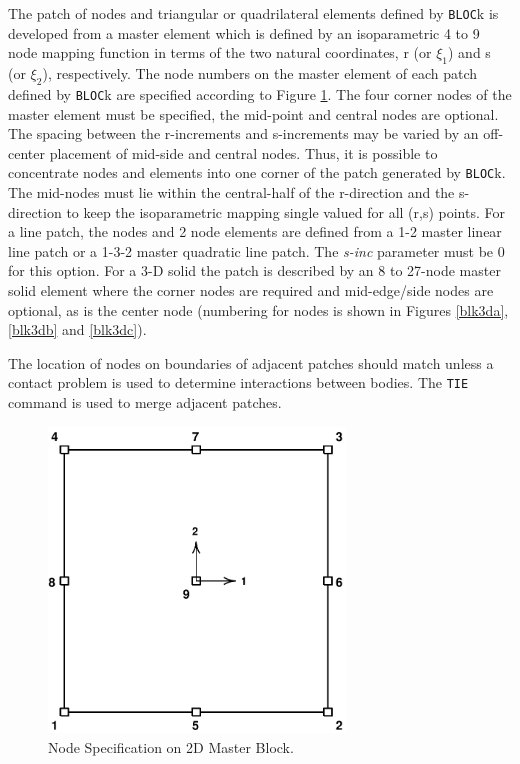 The patch of nodes and triangular or quadrilateral elements
defined by {\tt BLOC}k is developed from a master
element which is defined by an isoparametric 4 to 9
node mapping function in terms of the two natural coordinates,
r (or $\xi_1$) and s (or $\xi_2$), respectively.
The node numbers on the master element of each
patch defined by {\tt BLOC}k are specified according to Figure \ref{blk2d}.
The four corner nodes of the master element must be
specified, the mid-point and central nodes are optional.
The spacing between the r-increments and s-increments
may be varied by an off-center placement of mid-side and
central nodes.  Thus, it is possible to concentrate
nodes and elements into one corner of the patch generated by
{\tt BLOC}k.  The mid-nodes must lie within the central-half of
the r-direction and the s-direction to keep the isoparametric mapping
single valued for all (r,s) points.
For a line patch, the nodes and 2 node elements are
defined from a 1-2 master linear line patch or a 1-3-2 master
quadratic line patch.  The {\it s-inc} parameter must be 0 for this option.
For a 3-D solid the patch is described by an 8 to 27-node
master solid element where the corner nodes are
required and mid-edge/side nodes are optional, as is the
center node (numbering for nodes is shown in Figures \ref{blk3da}, \ref{blk3db}
and \ref{blk3dc}).

The location of nodes on boundaries of adjacent patches should match
unless a contact problem is used to determine interactions between
bodies.
The {\tt TIE} command is used to merge adjacent patches.

\begin{figure}[ht!]
\begin{center}
\includegraphics[width=3.1in]{../lmesh/block}
\caption{Node Specification on 2D Master Block.  \label{blk2d} }
\end{center}
\end{figure}

